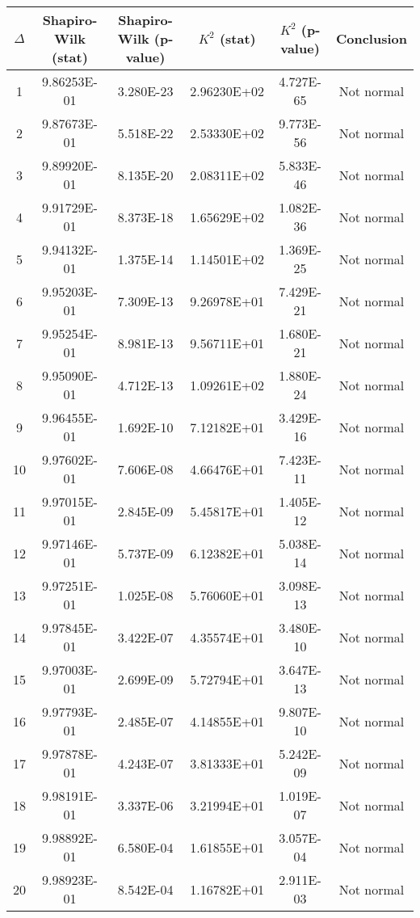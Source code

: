 \begin{table}[h]
	\begin{tabular}{|c|c|c|c|c|c|}
		\hline
		$\Delta$ &  Shapiro-Wilk (stat) & Shapiro-Wilk (p-value) & $K^2$ (stat) & $K^2$ (p-value) & Conclusion\\\hline
		\hline
		1 & 9.86253E-01 & 3.280E-23 & 2.96230E+02 & 4.727E-65 & Not normal\\\hline
		2 & 9.87673E-01 & 5.518E-22 & 2.53330E+02 & 9.773E-56 & Not normal\\\hline
		3 & 9.89920E-01 & 8.135E-20 & 2.08311E+02 & 5.833E-46 & Not normal\\\hline
		4 & 9.91729E-01 & 8.373E-18 & 1.65629E+02 & 1.082E-36 & Not normal\\\hline
		5 & 9.94132E-01 & 1.375E-14 & 1.14501E+02 & 1.369E-25 & Not normal\\\hline
		6 & 9.95203E-01 & 7.309E-13 & 9.26978E+01 & 7.429E-21 & Not normal\\\hline
		7 & 9.95254E-01 & 8.981E-13 & 9.56711E+01 & 1.680E-21 & Not normal\\\hline
		8 & 9.95090E-01 & 4.712E-13 & 1.09261E+02 & 1.880E-24 & Not normal\\\hline
		9 & 9.96455E-01 & 1.692E-10 & 7.12182E+01 & 3.429E-16 & Not normal\\\hline
		10 & 9.97602E-01 & 7.606E-08 & 4.66476E+01 & 7.423E-11 & Not normal\\\hline
		11 & 9.97015E-01 & 2.845E-09 & 5.45817E+01 & 1.405E-12 & Not normal\\\hline
		12 & 9.97146E-01 & 5.737E-09 & 6.12382E+01 & 5.038E-14 & Not normal\\\hline
		13 & 9.97251E-01 & 1.025E-08 & 5.76060E+01 & 3.098E-13 & Not normal\\\hline
		14 & 9.97845E-01 & 3.422E-07 & 4.35574E+01 & 3.480E-10 & Not normal\\\hline
		15 & 9.97003E-01 & 2.699E-09 & 5.72794E+01 & 3.647E-13 & Not normal\\\hline
		16 & 9.97793E-01 & 2.485E-07 & 4.14855E+01 & 9.807E-10 & Not normal\\\hline
		17 & 9.97878E-01 & 4.243E-07 & 3.81333E+01 & 5.242E-09 & Not normal\\\hline
		18 & 9.98191E-01 & 3.337E-06 & 3.21994E+01 & 1.019E-07 & Not normal\\\hline
		19 & 9.98892E-01 & 6.580E-04 & 1.61855E+01 & 3.057E-04 & Not normal\\\hline
		20 & 9.98923E-01 & 8.542E-04 & 1.16782E+01 & 2.911E-03 & Not normal\\\hline

\end{tabular}
\end{table}
